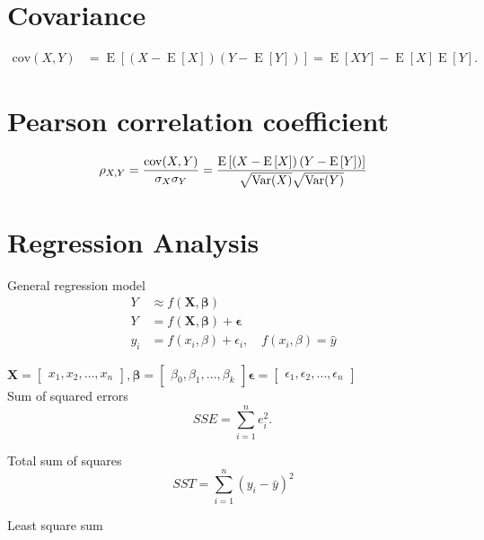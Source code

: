 \documentclass[11pt,a4paper]{article}
\begin{document}
\section*{Covariance}
\begin{align}
\mathrm{cov}(X,Y)
&= \operatorname{E}\left[\left(X - \operatorname{E}\left[X\right]\right) \left(Y - \operatorname{E}\left[Y\right]\right)\right] = \operatorname{E}\left[X Y\right] - \operatorname{E}\left[X\right] \operatorname{E}\left[Y\right].
\end{align}



\section*{Pearson correlation coefficient}
\begin{equation}
 \rho_{X,Y}={\mathrm{cov}(X,Y) \over \sigma_X \sigma_Y} ={\operatorname{E}\left[\left(X - \operatorname{E}\left[X\right]\right) \left(Y - \operatorname{E}\left[Y\right]\right)\right] \over \sqrt{\operatorname{Var}(X)} \sqrt{\operatorname{Var}(Y)}}
\end{equation}

\newpage

\section*{Regression Analysis}

General regression model
\begin{align*}
Y &\approx f (\mathbf {X}, \boldsymbol{\beta} ) \\
Y &= f (\mathbf {X}, \boldsymbol{\beta} ) + \boldsymbol{\epsilon} \\
y_{i} &= f(x_{i},\beta)+\epsilon_{i},\quad f(x_{i},\beta) = \hat{y}
\end{align*}

$\mathbf {X} = 
\begin{bmatrix}
x_{1},x_{2}, \dotsc ,x_{n}
\end{bmatrix},
\boldsymbol{\beta} = 
\begin{bmatrix}
\beta_{0},\beta_{1}, \dotsc ,\beta_{k}
\end{bmatrix}
\boldsymbol{\epsilon} = 
\begin{bmatrix}
\epsilon_{1}, \epsilon_{2}, \dotsc ,\epsilon_{n}
\end{bmatrix}
$ \\

Sum of squared errors
\begin{equation}
SSE=\sum_{i=1}^n e_i^2. \, 
\end{equation}

Total sum of squares
\begin{equation}
SST=\sum_{i=1}^{n}\left(y_{i}-\bar{y}\right)^2
\end{equation}

Least square sum
\end{document}
